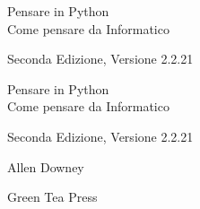 \documentclass[10pt]{book}
\newcommand{\theversion}{Seconda Edizione, Versione 2.2.21}
\newcommand{\thedate}{}
\begin{document}
\begin{latexonly}

\renewcommand{\blankpage}{\thispagestyle{empty} \quad \newpage}



\thispagestyle{empty}

\begin{flushright}
\vspace*{2.0in}

\begin{spacing}{3}
{\huge Pensare in Python}\\
{\Large Come pensare da Informatico}
\end{spacing}

\vspace{0.25in}

\theversion

\thedate

\vfill

\end{flushright}


\blankpage
\blankpage

\pagebreak
\thispagestyle{empty}

\begin{flushright}
\vspace*{2.0in}

\begin{spacing}{3}
{\huge Pensare in Python}\\
{\Large Come pensare da Informatico}
\end{spacing}

\vspace{0.25in}

\theversion

\thedate

\vspace{1in}


{\Large
Allen Downey\\
}


\vspace{0.5in}

{\Large Green Tea Press}


\end{flushright}
\end{latexonly}
\end{document}
